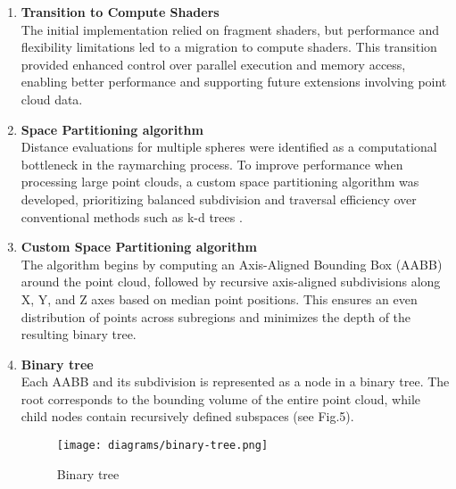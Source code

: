 \documentclass{rapportcs}
\begin{document}
\begin{enumerate}
            \item \textbf{Transition to Compute Shaders}\\
            The initial implementation relied on fragment shaders, but performance and flexibility limitations led to a migration to compute shaders.
            This transition provided enhanced control over parallel execution and memory access, enabling better performance and supporting future extensions involving point cloud data.\\
    
            \newpage
        
            \item \textbf{Space Partitioning algorithm}\\
            Distance evaluations for multiple spheres were identified as a computational bottleneck in the raymarching process.
            To improve performance when processing large point clouds, a custom space partitioning algorithm was developed, prioritizing balanced subdivision and traversal efficiency over conventional methods such as k-d trees \cite{Bruce_Naylor_Partitioning_Trees}.\\
        
            \item \textbf{Custom Space Partitioning algorithm}\\
            The algorithm begins by computing an Axis-Aligned Bounding Box (AABB) around the point cloud, followed by recursive axis-aligned subdivisions along X, Y, and Z axes based on median point positions.
            This ensures an even distribution of points across subregions and minimizes the depth of the resulting binary tree.\\
    
            \newpage
            
            \item \textbf{Binary tree}\\
            Each AABB and its subdivision is represented as a node in a binary tree.
            The root corresponds to the bounding volume of the entire point cloud, while child nodes contain recursively defined subspaces (see Fig.5).\\
        
            \begin{figure}[H]
                \centering
                \texttt{[image: diagrams/binary-tree.png]}
                \caption{Binary tree}
                \label{fig:label_image}
            \end{figure}
    

\end{enumerate}
\end{document}
